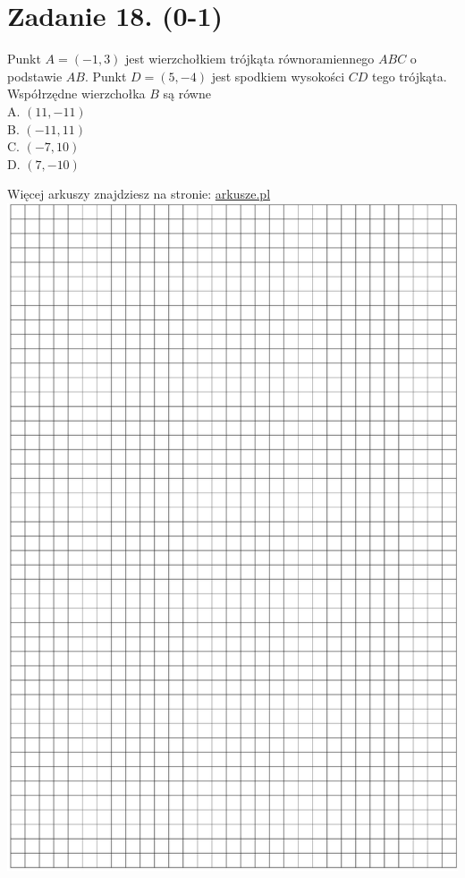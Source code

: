 \documentclass[10pt]{article}
\begin{document}
\section*{Zadanie 18. (0-1)}
Punkt \(A=(-1,3)\) jest wierzchołkiem trójkąta równoramiennego \(A B C\) o podstawie \(A B\). Punkt \(D=(5,-4)\) jest spodkiem wysokości \(C D\) tego trójkąta. Współrzędne wierzchołka \(B\) są równe\\
A. \((11,-11)\)\\
B. \((-11,11)\)\\
C. \((-7,10)\)\\
D. \((7,-10)\)

Więcej arkuszy znajdziesz na stronie: \href{http://arkusze.pl}{arkusze.pl}\\
\includegraphics[max width=\textwidth, center]{2024_11_21_dd21f7544b65bcf1b3c7g-07}
\end{document}

